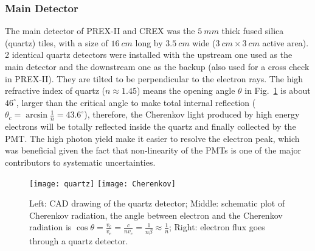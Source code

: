 \subsubsection{Main Detector}
The main detector of PREX-II and CREX was the $5\ mm$ thick fused silica (quartz) tiles,
with a size of $16\ cm$ long by $3.5\ cm$ wide ($3\ cm \times 3\ cm$ active area). 
2 identical quartz detectors were installed with the upstream one used as the 
main detector and the downstream one as the backup (also used for a cross check 
in PREX-II). They are tilted to be perpendicular to the electron rays.
The high refractive index of quartz ($n\approx 1.45$) means the opening angle $\theta$
in Fig.~\ref{fig:quartz} is about $46^\circ$, larger than the critical angle
to make total internal reflection ($\theta_c = \arcsin\frac{1}{n} = 43.6^\circ$),
therefore, the Cherenkov light produced by high energy electrons will be totally
reflected inside the quartz and finally collected by the PMT. The high photon
yield make it easier to resolve the electron peak, which was beneficial given
the fact that non-linearity of the PMTs is one of the major contributors to 
systematic uncertainties.
\begin{figure}
    \texttt{[image: quartz]}
    \texttt{[image: Cherenkov]}
    \caption{Left: CAD drawing of the quartz detector; 
    Middle: schematic plot of Cherenkov radiation, the angle between 
    electron and the Cherenkov radiation is 
    $\cos\theta = \frac{v_c}{v_e} = \frac{c}{nv_e} = \frac{1}{n\beta} \approx \frac{1}{n}$;
    Right: electron flux goes through a quartz detector.
    }
    \label{fig:quartz}
\end{figure}

